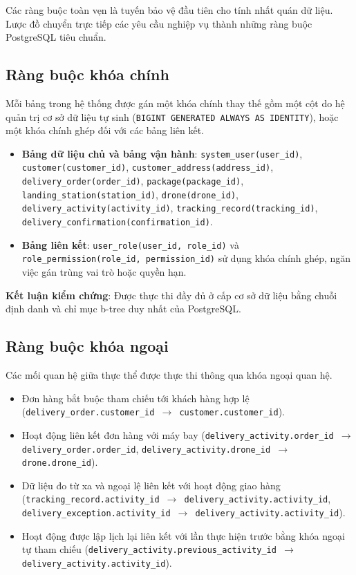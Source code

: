 Các ràng buộc toàn vẹn là tuyến bảo vệ đầu tiên cho tính nhất quán dữ liệu. Lược đồ chuyển trực tiếp các yêu cầu nghiệp vụ thành những ràng buộc PostgreSQL tiêu chuẩn.

\subsection{Ràng buộc khóa chính}
Mỗi bảng trong hệ thống được gán một khóa chính thay thế gồm một cột do hệ quản trị cơ sở dữ liệu tự sinh (\texttt{BIGINT GENERATED ALWAYS AS IDENTITY}), hoặc một khóa chính ghép đối với các bảng liên kết.
\begin{itemize}
    \item \textbf{Bảng dữ liệu chủ và bảng vận hành}: \texttt{system\_user(user\_id)}, \texttt{customer(customer\_id)}, \texttt{customer\_address(address\_id)}, \texttt{delivery\_order(order\_id)}, \texttt{package(package\_id)}, \texttt{landing\_station(station\_id)}, \texttt{drone(drone\_id)}, \texttt{delivery\_activity(activity\_id)}, \texttt{tracking\_record(tracking\_id)}, \texttt{delivery\_confirmation(confirmation\_id)}.
    \item \textbf{Bảng liên kết}: \texttt{user\_role(user\_id, role\_id)} và \texttt{role\_permission(role\_id, permission\_id)} sử dụng khóa chính ghép, ngăn việc gán trùng vai trò hoặc quyền hạn.
\end{itemize}
\textbf{Kết luận kiểm chứng}: Được thực thi đầy đủ ở cấp cơ sở dữ liệu bằng chuỗi định danh và chỉ mục b-tree duy nhất của PostgreSQL.

\subsection{Ràng buộc khóa ngoại}
Các mối quan hệ giữa thực thể được thực thi thông qua khóa ngoại quan hệ.
\begin{itemize}
    \item Đơn hàng bắt buộc tham chiếu tới khách hàng hợp lệ (\texttt{delivery\_order.customer\_id $\to$ customer.customer\_id}).
    \item Hoạt động liên kết đơn hàng với máy bay (\texttt{delivery\_activity.order\_id $\to$ delivery\_order.order\_id}, \texttt{delivery\_activity.drone\_id $\to$ drone.drone\_id}).
    \item Dữ liệu đo từ xa và ngoại lệ liên kết với hoạt động giao hàng (\texttt{tracking\_record.activity\_id $\to$ delivery\_activity.activity\_id}, \texttt{delivery\_exception.activity\_id $\to$ delivery\_activity.activity\_id}).
    \item Hoạt động được lập lịch lại liên kết với lần thực hiện trước bằng khóa ngoại tự tham chiếu (\texttt{delivery\_activity.previous\_activity\_id $\to$ delivery\_activity.activity\_id}).
\end{itemize}

